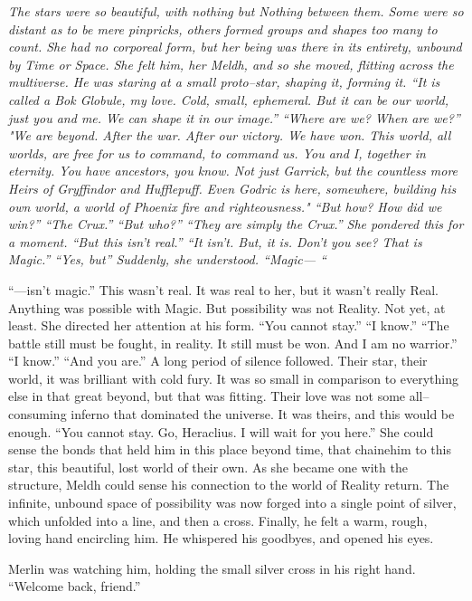 \simpleline
{}
\begin{flushright}{\itshape
The stars were so beautiful, with nothing but Nothing between them. Some were so distant as to be mere pinpricks, others formed groups and shapes too many to count. She had no corporeal form, but her being was there in its entirety, unbound by Time or Space. She felt him, her Meldh, and so she moved, flitting across the multiverse.
\SmallVSpace
He was staring at a small proto\mbox{--}star, shaping it, forming it. “It is called a Bok Globule, my love. Cold, small, ephemeral. But it can be our world, just you and me. We can shape it in our image.”
\SmallVSpace
“Where are we? When are we?”
\SmallVSpace
"We are beyond. After the war. After our victory. We have won. This world, all worlds, are free for us to command, to command us. You and I, together in eternity. You have ancestors, you know. Not just Garrick, but the countless more Heirs of Gryffindor and Hufflepuff. Even Godric is here, somewhere, building his own world, a world of Phoenix fire and righteousness."
\SmallVSpace
“But how? How did we win?”
\SmallVSpace
“The Crux.”
\SmallVSpace
“But who?”
\SmallVSpace
“They are simply the Crux.”
\SmallVSpace
She pondered this for a moment. “But this isn’t real.”
\SmallVSpace
“It isn’t. But, it is. Don’t you see? That is Magic.”
\SmallVSpace
“Yes, but{\el}” Suddenly, she understood. “Magic\mbox{---} “

“\mbox{---}isn’t magic.”
\SmallVSpace
This wasn’t real. It was real to her, but it wasn’t really Real. Anything was possible with Magic. But possibility was not Reality. Not yet, at least.
\SmallVSpace
She directed her attention at his form. “You cannot stay.”
\SmallVSpace
“I know.”
\SmallVSpace
“The battle still must be fought, in reality. It still must be won. And I am no warrior.”
\SmallVSpace
“I know.”
\SmallVSpace
“And you are.”
\SmallVSpace
A long period of silence followed. Their star, their world, it was brilliant with cold fury. It was so small in comparison to everything else in that great beyond, but that was fitting. Their love was not some all\mbox{--}consuming inferno that dominated the universe. It was theirs, and this would be enough.
\SmallVSpace
“You cannot stay. Go, Heraclius. I will wait for you here.”
\SmallVSpace
She could sense the bonds that held him in this place beyond time, that chainehim to this star, this beautiful, lost world of their own. As she became one with the structure, Meldh could sense his connection to the world of Reality return. The infinite, unbound space of possibility was now forged into a single point of silver, which unfolded into a line, and then a cross. Finally, he felt a warm, rough, loving hand encircling him.
\SomeVSpace
He whispered his goodbyes, and opened his eyes.}\end{flushright}
\simpleline
Merlin was watching him, holding the small silver cross in his right hand.
\SmallVSpace
“Welcome back, friend.”

